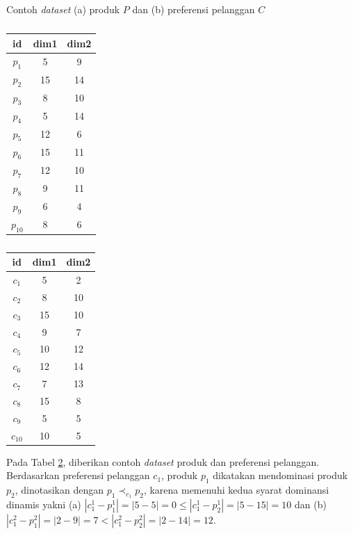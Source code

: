 \documentclass[conference]{IEEEtran}
\begin{document}
\begin{table}[htbp]
	\centering
	\caption{Contoh \textit{dataset} (a) produk $P$ dan (b) preferensi pelanggan $C$ \label{tab:dataset1}}	
	\begin{subtable}{.5\linewidth}	
		\small	
		\centering	
		\caption{}	
		\begin{tabular}{|c|c|c|}	
			\hline	
			\textbf{id} & \textbf{dim1} & \textbf{dim2}\\ \hline \hline	
			$p_1$ & 5 & 9\\ \hline	
			$p_2$ & 15 & 14\\ \hline	
			$p_3$ & 8 & 10\\ \hline	
			$p_4$ & 5 & 14\\ \hline	
			$p_5$ & 12 & 6\\ \hline	
			$p_6$ & 15 & 11\\ \hline	
			$p_7$ & 12 & 10\\ \hline	
			$p_8$ & 9 & 11\\ \hline	
			$p_9$ & 6 & 4\\ \hline	
			$p_{10}$ & 8 & 6\\ \hline	
		\end{tabular}	
	\end{subtable}%
	\begin{subtable}{.5\linewidth}	
		\small	
		\centering	
		\caption{}	
		\begin{tabular}{|c|c|c|}	
			\hline	
			\textbf{id} & \textbf{dim1} & \textbf{dim2}\\ \hline \hline	
			$c_1$ & 5 & 2\\ \hline	
			$c_2$ & 8 & 10\\ \hline	
			$c_3$ & 15 & 10\\ \hline	
			$c_4$ & 9 & 7\\ \hline	
			$c_5$ & 10 & 12\\ \hline	
			$c_6$ & 12 & 14\\ \hline	
			$c_7$ & 7 & 13\\ \hline	
			$c_8$ & 15 & 8\\ \hline	
			$c_9$ & 5 & 5\\ \hline	
			$c_{10}$ & 10 & 5\\ \hline	
		\end{tabular}	
	\end{subtable} 	
\end{table}

Pada Tabel \ref{tab:dataset1}, diberikan contoh \textit{dataset} produk dan preferensi pelanggan. Berdasarkan preferensi pelanggan $c_1$, produk $p_1$ dikatakan mendominasi produk $p_2$, dinotasikan dengan $p_1 \prec_{c_1} p_2$, karena memenuhi kedua syarat dominansi dinamis yakni (a) $|c_1^1 - p_1^1| = |5-5| = 0 \leq |c_1^1 - p_2^1| = |5-15| = 10$ dan (b) $|c_1^2 - p_1^2| = |2-9| = 7 < |c_1^2 - p_2^2| = |2-14| = 12$. 
\end{document}
